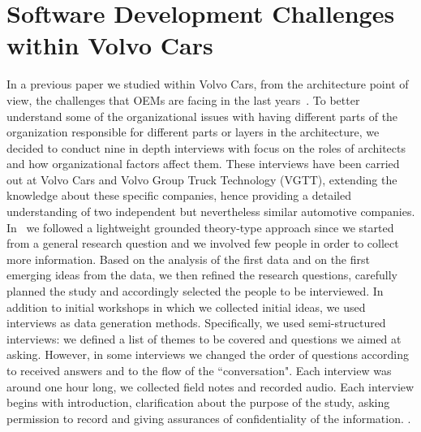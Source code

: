 \section{Software Development Challenges within Volvo Cars}\label{sec:lessonsLearned}

In a previous paper we studied within Volvo Cars,
from the architecture point of view,
the challenges that OEMs are facing in the last years~\cite{WICSA2015}. 
To better understand some of the
organizational issues with having different parts of the organization responsible for different parts or layers in the architecture, we decided to conduct nine in depth interviews with
focus on the roles of architects and how organizational factors affect them.
These interviews have been carried out at Volvo Cars  and Volvo Group Truck Technology
(VGTT), extending the knowledge about these specific companies, hence providing a detailed understanding of two independent but nevertheless similar automotive companies. %
In~\cite{WICSA2015} we 
followed a lightweight grounded theory-type approach since we started from a general research question and we involved few people in order to collect more information. Based on the analysis of the first data and on the first emerging ideas from the data, we then refined the research questions, carefully planned the study and accordingly selected the people to be interviewed. 
In addition to initial workshops in which we collected initial ideas, we used interviews as data generation methods. Specifically, we used semi-structured interviews: we defined a list of themes to be covered and questions we aimed at asking. However, in some interviews we changed the order of questions according to received answers and to the flow of the ``conversation". 
Each interview was around one hour long, we collected field notes and recorded audio. Each interview begins with introduction, clarification about the purpose of the study, asking permission to record and giving assurances of confidentiality of the information. . 


